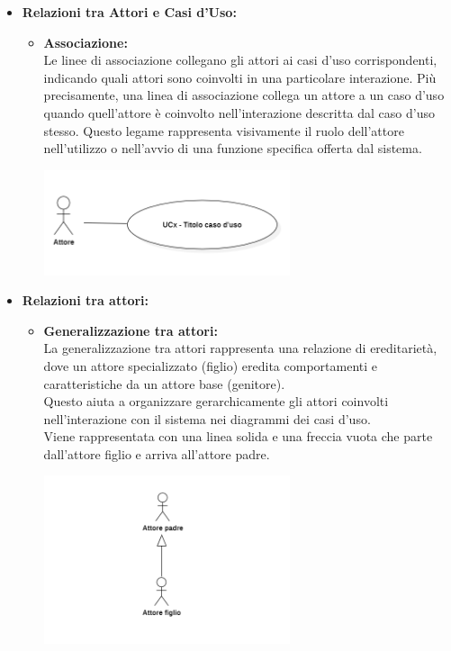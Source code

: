 \begin{itemize}
    \item \textbf{Relazioni tra Attori e Casi d'Uso:}
    \begin{itemize}
        \item \textbf{Associazione:} \\
        Le linee di associazione collegano gli attori ai casi d'uso corrispondenti, indicando quali attori sono coinvolti in una particolare interazione. Più precisamente, una linea di associazione collega un attore a un caso d'uso quando quell'attore è coinvolto nell'interazione descritta dal caso d'uso stesso. Questo legame rappresenta visivamente il ruolo dell'attore nell'utilizzo o nell'avvio di una funzione specifica offerta dal sistema.
        \begin{minipage}[t]{\linewidth}
            \centering
            \includegraphics[width=0.6\textwidth]{../Images/NormeDiProgetto/Associazione.PNG}
        \end{minipage}
    \end{itemize}

    \item \textbf{Relazioni tra attori:}
    \begin{itemize}
        \item \textbf{Generalizzazione tra attori:} \\
        La generalizzazione tra attori rappresenta una relazione di ereditarietà, dove un attore specializzato (figlio) eredita comportamenti e caratteristiche da un attore base (genitore). \\
        Questo aiuta a organizzare gerarchicamente gli attori coinvolti nell'interazione con il sistema nei diagrammi dei casi d'uso. \\
        Viene rappresentata con una linea solida e una freccia vuota che parte dall'attore figlio e arriva all'attore padre.
        \begin{minipage}[t]{\linewidth}
            \centering
            \includegraphics[width=0.6\textwidth]{../Images/NormeDiProgetto/GeneralizzazioneAttori.PNG}
        \end{minipage}
    \end{itemize}
    

\end{itemize}
